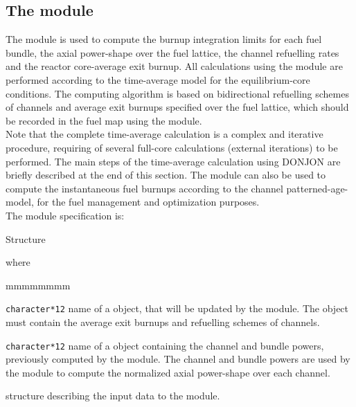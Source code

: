 \subsection{The  module}\label{sect:tavg}

\vskip 0.2cm
The  module is used to compute the burnup integration limits for each
fuel bundle, the axial power-shape over the fuel lattice, the channel refuelling rates
and the reactor core-average exit burnup. All calculations using the 
module are performed according to the time-average model for the equilibrium-core
conditions. The computing algorithm is based on bidirectional refuelling schemes of
channels and average exit burnups specified over the fuel lattice, which should be
recorded in the fuel map using the  module.\\

Note that the complete time-average calculation is a complex and iterative procedure,
requiring of several full-core calculations (external iterations) to be performed. The main
steps of the time-average calculation using DONJON are briefly described at the end
of this section. The  module can also be used to compute the instantaneous
fuel burnups according to the channel patterned-age-model, for the fuel management
and optimization purposes.\\

\noindent
The  module specification is: 

\begin{DataStructure}{Structure }
 \moc{:=}  
 \moc{::} 
\end{DataStructure}

\noindent where

\begin{ListeDeDescription}{mmmmmmmm}

\item[\dusa{FMAP}] \texttt{character*12} name of a  object,
that will be updated by the  module. The  object
must contain the average exit burnups and refuelling schemes of channels.

\item[\dusa{POWER}] \texttt{character*12} name of a  object
containing the channel and bundle powers, previously computed by the
 module. The channel and bundle powers are used by the
 module to compute the normalized axial power-shape over
each channel. 

\item[\dstr{desctavg}] structure describing the input data to the  module.

\end{ListeDeDescription}

